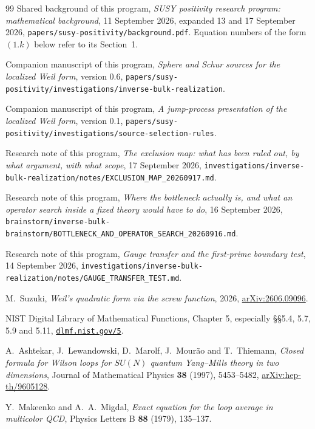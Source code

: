 \begin{thebibliography}{99}
Shared background of this program, \emph{SUSY positivity research program:
mathematical background}, 11 September 2026, expanded 13 and 17 September 2026,
\texttt{papers/susy-positivity/background.pdf}. Equation numbers of the form
$(1.k)$ below refer to its Section~1.

Companion manuscript of this program, \emph{Sphere and Schur sources for the
localized Weil form}, version 0.6,
\texttt{papers/susy-positivity/investigations/inverse-bulk-realization}.

Companion manuscript of this program, \emph{A jump-process presentation of the
localized Weil form}, version 0.1,
\texttt{papers/susy-positivity/investigations/source-selection-rules}.

Research note of this program, \emph{The exclusion map: what has been ruled out,
by what argument, with what scope}, 17 September 2026,
\texttt{investigations/inverse-bulk-realization/notes/EXCLUSION\_MAP\_20260917.md}.

Research note of this program, \emph{Where the bottleneck actually is, and what
an operator search inside a fixed theory would have to do}, 16 September 2026,
\texttt{brainstorm/inverse-bulk-brainstorm/BOTTLENECK\_AND\_OPERATOR\_SEARCH\_20260916.md}.

Research note of this program, \emph{Gauge transfer and the first-prime boundary
test}, 14 September 2026,
\texttt{investigations/inverse-bulk-realization/notes/GAUGE\_TRANSFER\_TEST.md}.

M.~Suzuki, \emph{Weil's quadratic form via the screw function}, 2026,
\href{https://arxiv.org/abs/2606.09096}{arXiv:2606.09096}.

NIST Digital Library of Mathematical Functions, Chapter 5,
especially \S\S5.4, 5.7, 5.9 and 5.11,
\href{https://dlmf.nist.gov/5}{\texttt{dlmf.nist.gov/5}}.

A.~Ashtekar, J.~Lewandowski, D.~Marolf, J.~Mour\~ao and T.~Thiemann,
\emph{Closed formula for Wilson loops for $SU(N)$ quantum Yang--Mills theory in
two dimensions}, Journal of Mathematical Physics \textbf{38} (1997), 5453--5482,
\href{https://arxiv.org/abs/hep-th/9605128}{arXiv:hep-th/9605128}.

Y.~Makeenko and A.~A.~Migdal, \emph{Exact equation for the loop average in
multicolor QCD}, Physics Letters B \textbf{88} (1979), 135--137.


\end{thebibliography}
